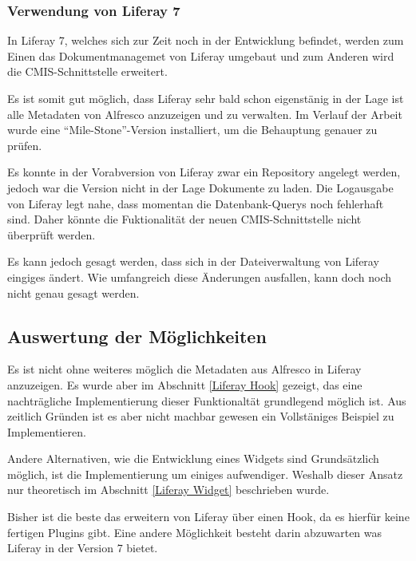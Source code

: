 \subsubsection{Verwendung von Liferay 7}
In Liferay 7, welches sich zur Zeit noch in der Entwicklung befindet, werden zum Einen das Dokumentmanagemet von Liferay umgebaut und zum Anderen wird die \ac{CMIS}-Schnittstelle erweitert. \cite{liferay7}

Es ist somit gut m\"oglich, dass Liferay sehr bald schon eigenst\"anig in der Lage ist alle Metadaten von Alfresco anzuzeigen und zu verwalten.
Im Verlauf der Arbeit wurde eine "`Mile-Stone"'-Version installiert, um die Behauptung genauer zu pr\"ufen.

Es konnte in der Vorabversion von Liferay zwar ein Repository angelegt werden, jedoch war die Version nicht in der Lage Dokumente zu laden. Die Logausgabe von Liferay legt nahe, dass momentan die Datenbank-Querys noch fehlerhaft sind. Daher k\"onnte die Fuktionalit\"at der neuen \ac{CMIS}-Schnittstelle nicht \"uberpr\"uft werden.

Es kann jedoch gesagt werden, dass sich in der Dateiverwaltung von Liferay eingiges \"andert. Wie umfangreich diese \"Anderungen ausfallen, kann doch noch nicht genau gesagt werden.

\subsection{Auswertung der M\"oglichkeiten}
Es ist nicht ohne weiteres m\"oglich die Metadaten aus Alfresco in Liferay anzuzeigen. Es wurde aber im Abschnitt \ref{Liferay Hook} gezeigt, das eine nachtr\"agliche Implementierung dieser Funktionalt\"at grundlegend m\"oglich ist. Aus zeitlich Gr\"unden ist es aber nicht machbar gewesen ein Vollst\"aniges Beispiel zu Implementieren.

Andere Alternativen, wie die Entwicklung eines Widgets sind Grunds\"atzlich m\"oglich, ist die Implementierung um einiges aufwendiger. Weshalb dieser Ansatz nur theoretisch im Abschnitt \ref{Liferay Widget} beschrieben wurde.

Bisher ist die beste das erweitern von Liferay \"uber einen Hook, da es hierf\"ur keine fertigen Plugins gibt. Eine andere M\"oglichkeit besteht darin abzuwarten was Liferay in der Version 7 bietet.

